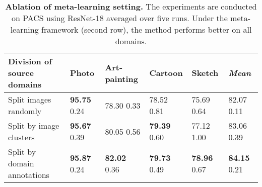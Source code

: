 \documentclass{article} \usepackage[table]{xcolor}
\begin{document}
\begin{table}[t]
\begin{minipage}[t]{\linewidth}
{\begin{tabular}{llllll}
\toprule
Division of source domains  & Photo    & Art-painting         & Cartoon        & Sketch         & \textit{Mean}       \\ \midrule
Split images randomly
& \textbf{95.75} \scriptsize{0.24} & 78.30 \scriptsize{0.33} & 78.52 \scriptsize{0.81} & 75.69 \scriptsize{0.64} & 82.07 \scriptsize{0.11} \\
Split by image clusters
& \textbf{95.67} \scriptsize{0.39} & 80.05 \scriptsize{0.56} & \textbf{79.39} \scriptsize{0.60} & 77.12 \scriptsize{1.00} & 83.06 \scriptsize{0.39} \\
Split by domain annotations
& \textbf{95.87} \scriptsize{0.24}         & \textbf{82.02} \scriptsize{0.36}  & \textbf{79.73} \scriptsize{0.49} & \textbf{78.96} \scriptsize{0.67} & \textbf{84.15} \scriptsize{0.21} \\ 
\bottomrule
\end{tabular}
}
\end{minipage}
\begin{minipage}[t]{\linewidth}
\vspace{1mm}
\centering
\caption{
\textbf{Ablation of meta-learning setting.} The experiments are conducted on PACS using ResNet-18 averaged over five runs. Under the meta-learning framework (second row), the method performs better on all domains.
}
\centering
\label{metaablation}
\vspace{-6mm}
\end{minipage}
\end{table}
\end{document}
